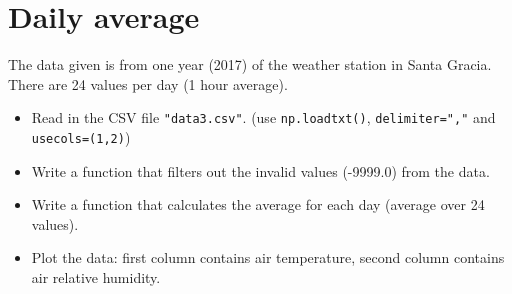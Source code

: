 \section{Daily average}

The data given is from one year (2017) of the weather station in Santa Gracia.
There are 24 values per day (1 hour average).

\begin{itemize}
    \item Read in the CSV file \verb|"data3.csv"|. (use \verb|np.loadtxt()|, \verb|delimiter=","| and \verb|usecols=(1,2)|)
    \item Write a function that filters out the invalid values (-9999.0) from the data.
    \item Write a function that calculates the average for each day (average over 24 values).
    \item Plot the data: first column contains air temperature, second column contains air relative humidity.
\end{itemize}
